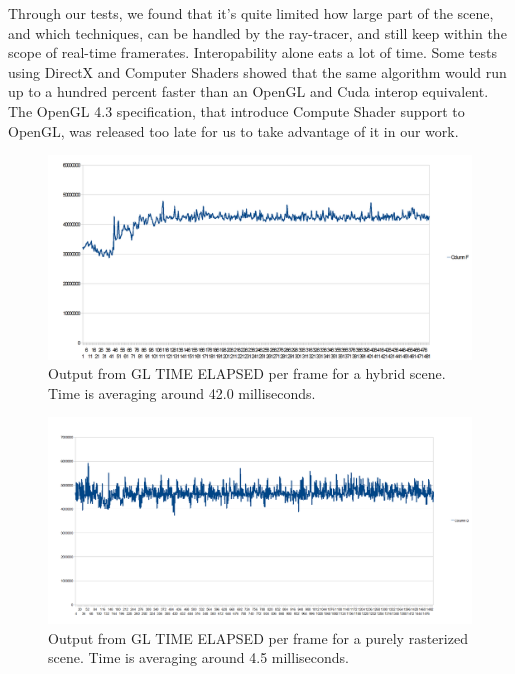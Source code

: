 Through our tests, we found that it's quite limited how large part of the scene, and which techniques, can be handled by the ray-tracer, and still keep within the scope of real-time framerates. Interopability alone eats a lot of time. Some tests using DirectX and Computer Shaders showed that the same algorithm would run up to a hundred percent faster than an OpenGL and Cuda interop equivalent. The OpenGL 4.3 specification, that introduce Compute Shader support to OpenGL, was released too late for us to take advantage of it in our work.

\begin{figure}[H]
	\centering
	\includegraphics[width=1.00\textwidth]{Media/gpu_timer_hybrid.png}
	\caption{Output from GL TIME ELAPSED per frame for a hybrid scene. Time is averaging around 42.0 milliseconds.}	
	\label{fig:hybrid_gpu_time}
\end{figure}

\begin{figure}[H]
	\centering
	\includegraphics[width=1.00\textwidth]{Media/gpu_timer_raster_only.png}
	\caption{Output from GL TIME ELAPSED per frame for a purely rasterized scene. Time is averaging around 4.5 milliseconds.}
	\label{fig:raster_gpu_time}
\end{figure}

